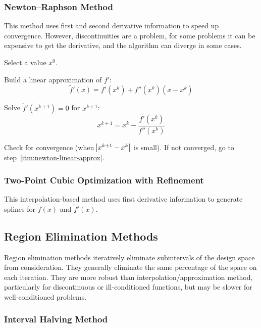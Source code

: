 \documentclass{article}
\begin{document}
\subsubsection{Newton--Raphson Method}\label{sec:newton-raphson}

This method uses first and second derivative information to speed up convergence. However,
discontinuities are a problem, for some problems it can be expensive to get the derivative, and the
algorithm can diverge in some cases.

\begin{enumerate*}
\item Select a value \(x^0\).
\item \label{itm:newton-linear-approx} Build a linear approximation of \(f'\):
\[\tilde{f}'(x) = f'(x^k) + f''(x^k)(x - x^k)\]
\item Solve \(\tilde{f}'(x^{k+1}) = 0\) for \(x^{k+1}\):
\[x^{k+1} = x^k - \frac{f'(x^k)}{f''(x^k)}\]
\item Check for convergence (when \(\abs{x^{k+1} - x^k}\) is small). If not converged, go to
  step~\ref{itm:newton-linear-approx}.
\end{enumerate*}

\subsubsection{Two-Point Cubic Optimization with Refinement}\label{sec:cubic-interpolation}

This interpolation-based method uses first derivative information to generate splines for
\(\tilde{f}(x)\) and \(\tilde{f}'(x)\).

\subsection{Region Elimination Methods}\label{sec:region-elimination}

Region elimination methods iteratively eliminate subintervals of the design space from
consideration. They generally eliminate the same percentage of the space on each iteration. They are
more robust than interpolation\slash{}approximation method, particularly for discontinuous or
ill-conditioned functions, but may be slower for well-conditioned problems.

\subsubsection{Interval Halving Method}\label{sec:interval-halving}
\end{document}
